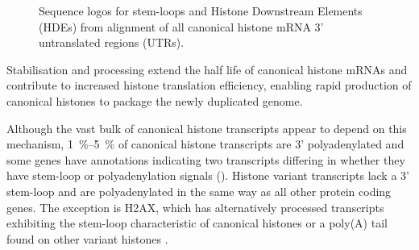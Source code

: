   \begin{figure}
    \centering
    \hfill
    \caption{%
      Sequence logos for stem-loops and Histone Downstream Elements (HDEs)
      from alignment of all canonical histone mRNA 3' untranslated
      regions (UTRs).
    }
  \end{figure}

  Stabilisation and processing extend the half life of canonical histone mRNAs
  and contribute to increased histone translation efficiency,
  enabling rapid production of canonical histones to package the newly duplicated genome.

  Although the vast bulk of canonical histone transcripts appear to depend on this mechanism,
  \SIrange{1}{5}{\percent} of canonical histone transcripts
  are 3' polyadenylated \citep{YangGenomeBiol2011}
  and some genes have annotations indicating two transcripts
  differing in whether they have stem-loop or polyadenylation
  signals ().
  Histone variant transcripts lack a 3' stem-loop and are
  polyadenylated in the same way as all other protein coding genes.
  The exception is H2AX, which has alternatively processed transcripts
  exhibiting the stem-loop characteristic of canonical histones
  or a poly(A) tail found on other variant histones \citep{HTwoAX-transcripts,our-H2AX-review}.
